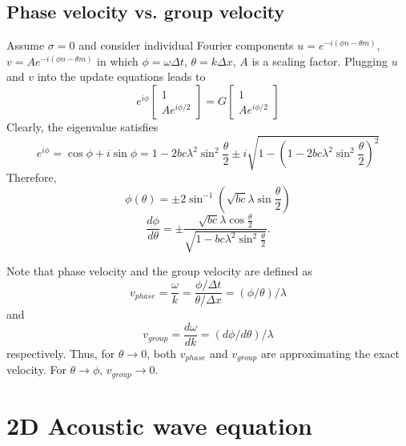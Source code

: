 \subsection{Phase velocity vs. group velocity}

Assume $\sigma=0$ and consider individual Fourier components $u=e^{-i(\phi n-\theta m)}$, $v=Ae^{-i(\phi n-\theta m)}$ in which $\phi=\omega\Delta t$, $\theta=k\Delta x$, $A$ is a scaling factor. Plugging $u$ and $v$ into the update equations leads to
\begin{equation}
 e^{i\phi}\begin{bmatrix}
           1\\
           Ae^{i\phi/2}
          \end{bmatrix}
=G\begin{bmatrix}
  1\\
  Ae^{i\phi/2}
 \end{bmatrix}
\end{equation}
Clearly, the eigenvalue satisfies
\begin{equation} 
e^{i\phi}=\cos\phi+i\sin\phi=1-2bc\lambda^2\sin^2\frac{\theta}{2}\pm i\sqrt{1-\left(1-2bc\lambda^2\sin^2\frac{\theta}{2} \right)^2}
\end{equation}
Therefore,
\begin{equation}
 \phi(\theta)=\pm 2\sin^{-1}\left(\sqrt{bc}\lambda\sin\frac{\theta}{2} \right)
\end{equation}
\begin{equation}
 \frac{d\phi}{d\theta}=\pm \frac{\sqrt{bc}\lambda\cos\frac{\theta}{2}}{\sqrt{1-bc\lambda^2\sin^2\frac{\theta}{2}}}.
\end{equation}


 Note that phase velocity and the group velocity are defined as
\begin{equation}
 v_{phase}=\frac{\omega}{k}=\frac{\phi/\Delta t}{\theta/\Delta x}=(\phi/\theta)/\lambda
\end{equation}
and
\begin{equation}
 v_{group}=\frac{d \omega}{d k}=(d\phi/d\theta)/\lambda
\end{equation}
respectively. Thus, for $\theta\rightarrow 0$, both $v_{phase}$ and $v_{group}$ are approximating the exact velocity. For $\theta\rightarrow\phi$, $v_{group}\rightarrow 0$.



\section{2D Acoustic wave equation}

